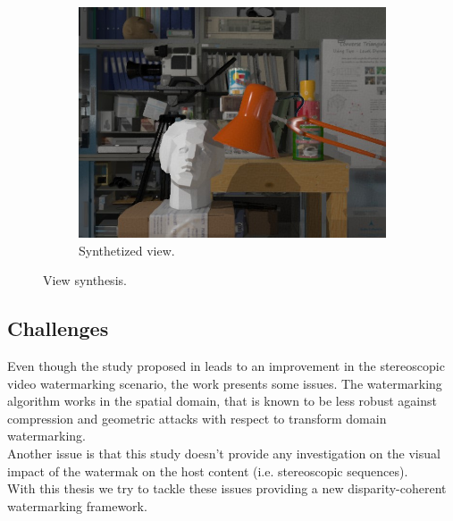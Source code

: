 \begin{figure}[h!]
\begin{subfigure}[]{0.4\textwidth}
\centering
\includegraphics[width=1\textwidth]{./img/synth_view_watermarked.jpg}
\caption{\small{Synthetized view.}}
\label{fig:vs3}
\end{subfigure}
\caption{\small{View synthesis.}\label{fig:vs}}
\end{figure}

\subsection{Challenges}
Even though the study proposed in \cite{DOER} leads to an improvement in the stereoscopic video watermarking scenario, the work presents some issues. The watermarking algorithm works in the spatial domain, that is known to be less robust against compression and geometric attacks with respect to transform domain watermarking.\\
Another issue is that this study doesn't provide any investigation on the visual impact of the watermak on the host content (i.e. stereoscopic sequences).\\
With this thesis we try to tackle these issues providing a new disparity-coherent watermarking framework.









